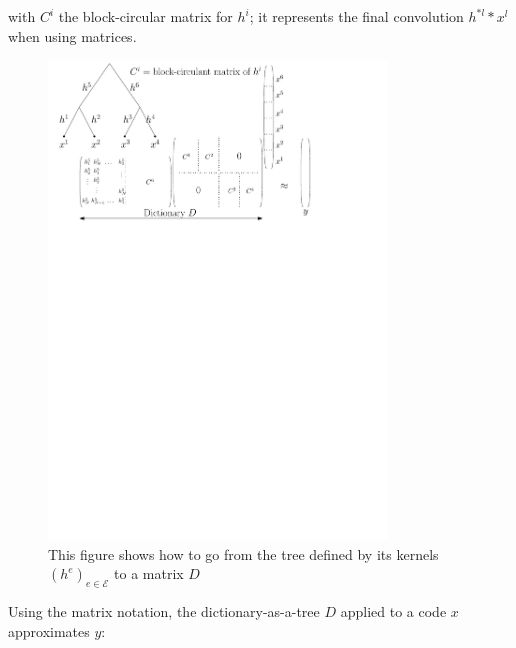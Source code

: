 with $C^i$ the block-circular matrix for $h^i$; it represents the final convolution $h^{*l}*x^l$ when using matrices.


\begin{figure}[!ht] \centering
	\includegraphics[width=0.8\textwidth]{figures/block-circular-matrix}
	\caption{This figure shows how to go from the tree defined by its kernels $(h^e)_{e \in \mathcal{E}}$ to a matrix $D$} \label{fig_block_circular}
\end{figure}


Using the matrix notation, the dictionary-as-a-tree $D$ applied to a code $x$ approximates $y$:


